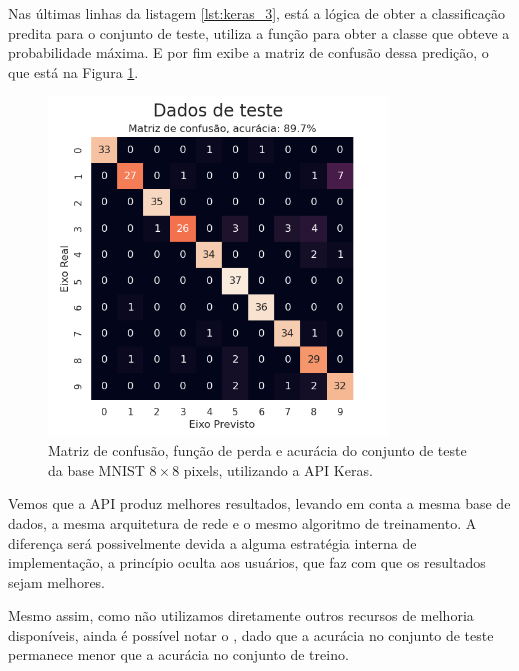 Nas últimas linhas da listagem \ref{lst:keras_3}, está a lógica de obter a classificação predita para o conjunto de teste, utiliza a função  para obter a classe que obteve a probabilidade máxima. E por fim exibe a matriz de confusão dessa predição, o que está na Figura \ref{fig:keras_test}.

\begin{figure}[htb]
\centering
\includegraphics[width=9cm]{figuras/keras_test}
\caption{Matriz de confusão, função de perda e acurácia do conjunto de teste da base MNIST ${8\times8}$ pixels, utilizando a API Keras.}
\label{fig:keras_test}
\end{figure}

Vemos que a API produz melhores resultados, levando em conta a mesma base de dados, a mesma arquitetura de rede e o mesmo algoritmo de treinamento. A diferença será possivelmente devida a alguma estratégia interna de implementação, a princípio oculta aos usuários, que faz com que os resultados sejam melhores. 

Mesmo assim, como não utilizamos diretamente outros recursos de melhoria disponíveis, ainda é possível notar o , dado que a acurácia no conjunto de teste permanece menor que a acurácia no conjunto de treino. 

